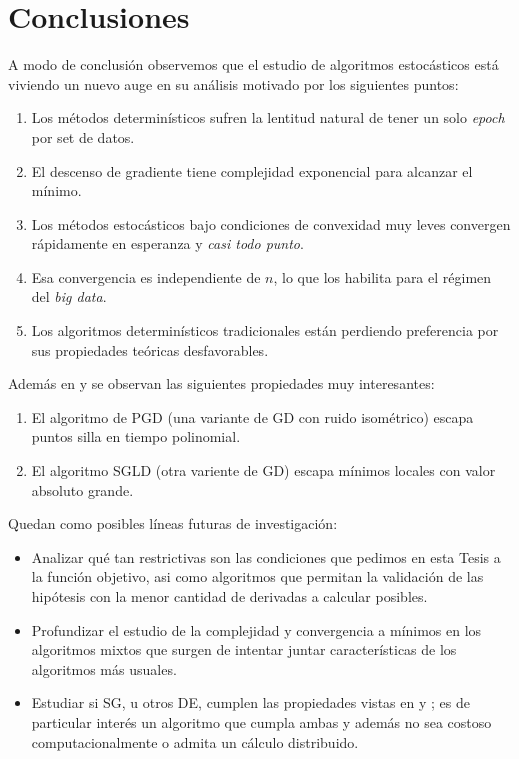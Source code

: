\chapter{Conclusiones}\label{ch:conclusiones}

A modo de conclusi\'on observemos que el estudio de algoritmos estoc\'asticos est\'a viviendo un nuevo auge en su an\'alisis motivado por los siguientes puntos:

\begin{enumerate}
	\item Los m\'etodos determin\'isticos sufren la lentitud natural de tener un solo \textit{epoch} por set de datos.
	\item El descenso de gradiente tiene complejidad exponencial para alcanzar el m\'inimo.
	\item Los m\'etodos estoc\'asticos bajo condiciones de convexidad muy leves convergen r\'apidamente en esperanza y \textit{casi todo punto}.
	\item Esa convergencia es independiente de $n$, lo que los habilita para el r\'egimen del \textit{big data}.
	\item Los algoritmos determin\'isticos tradicionales est\'an perdiendo preferencia por sus propiedades te\'oricas desfavorables.
\end{enumerate}

Adem\'as en \cite{jin:2017} y \cite{zhang:2017} se observan las siguientes propiedades muy interesantes:

\begin{enumerate}
	\item El algoritmo de PGD (una variante de GD con ruido isom\'etrico) escapa puntos silla en tiempo polinomial.
	\item El algoritmo SGLD (otra variente de GD) escapa m\'inimos locales con valor absoluto grande.
\end{enumerate}

Quedan como posibles l\'ineas futuras de investigaci\'on:

\begin{itemize}
	\item Analizar qu\'e tan restrictivas son las condiciones que pedimos en esta Tesis a la funci\'on objetivo, asi como algoritmos que permitan la validaci\'on de las hip\'otesis con la menor cantidad de derivadas a calcular posibles.
	\item Profundizar el estudio de la complejidad y convergencia a m\'inimos en los algoritmos mixtos que surgen de intentar juntar caracter\'isticas de los algoritmos m\'as usuales.
	\item Estudiar si SG, u otros DE, cumplen las propiedades vistas en \cite{jin:2017} y \cite{zhang:2017}; es de particular inter\'es un algoritmo que cumpla ambas y adem\'as no sea costoso computacionalmente o admita un c\'alculo distribuido.
\end{itemize}